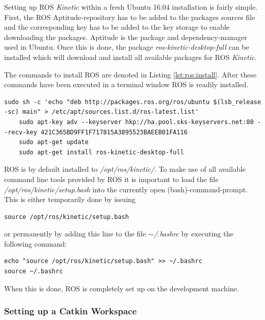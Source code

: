 Setting up ROS \textit{Kinetic} within a fresh Ubuntu 16.04 installation is fairly simple. First, the ROS Aptitude-repository has to be added to the packages sources file and the corresponding key has to be added to the key storage to enable downloading the packages. Aptitude is the package and dependency-manager used in Ubuntu. Once this is done, the package \textit{ros-kinetic-desktop-full} can be installed which will download and install all available packages for ROS \textit{Kinetic}.

The commands to install ROS are denoted in Listing \ref{lst:ros:install}. After these commands have been executed in a terminal window ROS is readily installed.

\begin{minipage}{\linewidth}
	\begin{lstlisting}[caption={Commands for installing ROS\cite{ros:install}},label={lst:ros:install}]
	sudo sh -c 'echo "deb http://packages.ros.org/ros/ubuntu $(lsb_release -sc) main" > /etc/apt/sources.list.d/ros-latest.list'
	sudo apt-key adv --keyserver hkp://ha.pool.sks-keyservers.net:80 --recv-key 421C365BD9FF1F717815A3895523BAEEB01FA116
	sudo apt-get update
	sudo apt-get install ros-kinetic-desktop-full
	\end{lstlisting}
\end{minipage}

ROS is by default installed to \textit{/opt/ros/kinetic/}. To make use of all available command line tools provided by ROS it is important to load the file \textit{/opt/ros/kinetic/setup.bash} into the currently open (bash)-command-prompt. This is either temporarily done by issuing

\begin{lstlisting}[caption={Temporarily loading the ROS environment into bash}]
source /opt/ros/kinetic/setup.bash
\end{lstlisting}

or permanently by adding this line to the file \textit{$\sim$/.bashrc} by executing the following command:

\begin{lstlisting}[caption={Permamently installing the ROS environment into bash}]
echo "source /opt/ros/kinetic/setup.bash" >> ~/.bashrc
source ~/.bashrc
\end{lstlisting}

When this is done, ROS is completely set up on the development machine.

\subsubsection[Setting up Catkin]{Setting up a Catkin Workspace} 

